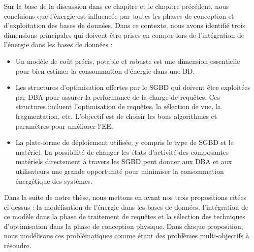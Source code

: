 Sur la base de la discussion dans ce chapitre et le chapitre précédent, nous concluions que l'énergie est influencée par toutes les phases de conception et d'exploitation des bases de données. Dans ce contexte, nous avons identifié trois dimensions principales qui doivent être prises en compte lors de l'intégration de l'énergie dans les bases de données :
\begin{itemize}
 \item Un modèle de coût précis, potable et robuste est une dimension essentielle pour bien estimer la consommation d'énergie dans une BD.
 \item Les structures d'optimisation offertes par le SGBD qui doivent être exploitées par DBA pour assurer la performance de la charge de requêtes. Ces structures incluent l'optimisation de requêtes, la sélection de vue, la fragmentation, etc. L'objectif est de choisir les bons algorithmes et paramètres pour améliorer l'EE.
 \item La plate-forme de déploiement utilisée, y compris le type de SGBD et le matériel. La possibilité de changer les états d'activité des composantes matériels directement à travers les SGBD peut donner aux DBA et aux utilisateurs une grande opportunité pour minimiser la consommation énergétique des systèmes.
\end{itemize}

Dans la suite de notre thèse, nous mettons en avant nos trois propositions citées ci-dessus : la modélisation de l'énergie dans les bases de données, l'intégration de ce modèle dans la phase de traitement de requêtes et la sélection des techniques d'optimisation dans la phase de conception physique. Dans chaque proposition, nous modélisons ces problématiques comme étant des problèmes multi-objectifs à résoudre.
